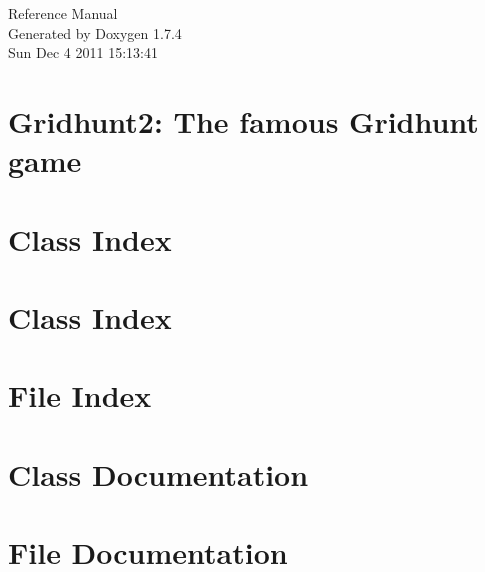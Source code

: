 \documentclass[a4paper]{book}
\begin{document}
\hypersetup{pageanchor=false}
\begin{titlepage}
\vspace*{7cm}
\begin{center}
{\Large Reference Manual}\\
\vspace*{1cm}
{\large Generated by Doxygen 1.7.4}\\
\vspace*{0.5cm}
{\small Sun Dec 4 2011 15:13:41}\\
\end{center}
\end{titlepage}
\clearemptydoublepage
{}
\tableofcontents
\clearemptydoublepage
{}
\hypersetup{pageanchor=true}
\chapter{Gridhunt2: The famous Gridhunt game}
\label{index}\hypertarget{index}{}
\chapter{Class Index}

\chapter{Class Index}

\chapter{File Index}

\chapter{Class Documentation}









\chapter{File Documentation}

\printindex
\end{document}
